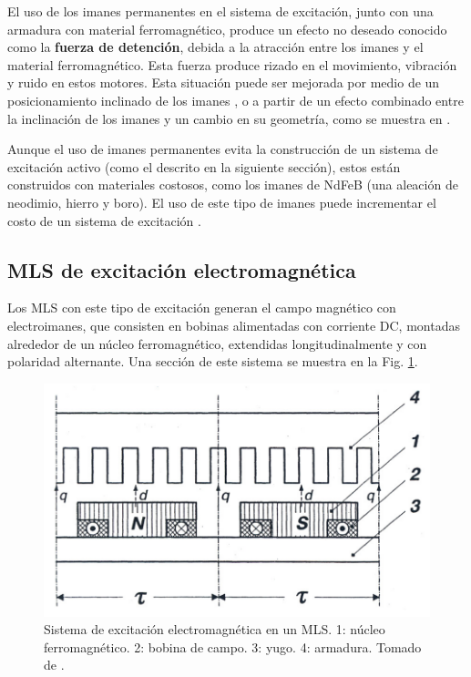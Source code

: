 El uso de los imanes permanentes en el sistema de excitación, junto con una armadura con material ferromagnético, produce un efecto no deseado conocido como la \textbf{fuerza de detención}, debida a la atracción entre los imanes y el material ferromagnético. Esta fuerza produce rizado en el movimiento, vibración y ruido en estos motores. Esta situación puede ser mejorada por medio de un posicionamiento inclinado de los imanes \cite{gieras2000}, o a partir de un efecto combinado entre la inclinación de los imanes y un cambio en su geometría, como se muestra en \cite{seokjang2002,tavana2010}.

Aunque el uso de imanes permanentes evita la construcción de un sistema de excitación activo (como el descrito en la siguiente sección), estos están construidos con materiales costosos, como los imanes de NdFeB (una aleación de neodimio, hierro y boro). El uso de este tipo de imanes puede incrementar el costo de un sistema de excitación \cite{gieras2000}.

\subsection{MLS de excitación electromagnética}
Los MLS con este tipo de excitación generan el campo magnético con electroimanes, que consisten en bobinas alimentadas con corriente DC, montadas alrededor de un núcleo ferromagnético, extendidas longitudinalmente y con polaridad alternante. Una sección de este sistema se muestra en la Fig. \ref{lsm_eme}.

\begin{figure}[hbtp]
\centering
\includegraphics[scale=0.6]{../img/lsm_eme.PNG}
\caption{Sistema de excitación electromagnética en un MLS. 1: núcleo ferromagnético. 2: bobina de campo. 3: yugo. 4: armadura. Tomado de \cite{gieras2000}.}
\label{lsm_eme}
\end{figure}

